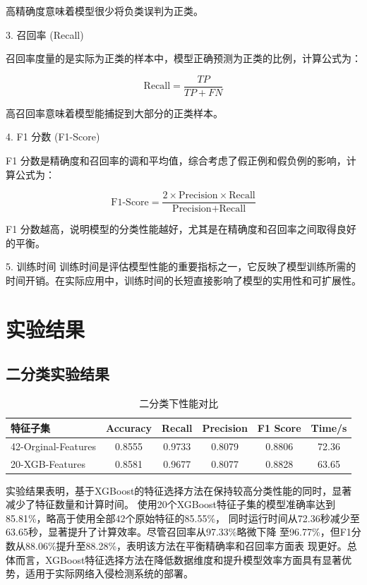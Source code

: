 \documentclass{article}
\begin{document}
   高精确度意味着模型很少将负类误判为正类。

3. 召回率 (Recall)

   召回率度量的是实际为正类的样本中，模型正确预测为正类的比例，计算公式为：

   \[
   \text{Recall} = \frac{TP}{TP + FN}
   \]

   高召回率意味着模型能捕捉到大部分的正类样本。

4. F1 分数 (F1-Score)

   F1 分数是精确度和召回率的调和平均值，综合考虑了假正例和假负例的影响，计算公式为：

   \[
   \text{F1-Score} = \frac{2 \times \text{Precision} \times \text{Recall}}{\text{Precision} + \text{Recall}}
   \]

   F1 分数越高，说明模型的分类性能越好，尤其是在精确度和召回率之间取得良好的平衡。

5. 训练时间
   训练时间是评估模型性能的重要指标之一，它反映了模型训练所需的时间开销。在实际应用中，训练时间的长短直接影响了模型的实用性和可扩展性。



\section{实验结果}
\subsection{二分类实验结果}
\begin{table}[H]
  \caption{二分类下性能对比}
  \label{table:feature_selection_performance}
  \centering
  \begin{tabular}{lccccc}
    \toprule
    特征子集          & Accuracy & Recall & Precision & F1 Score & Time/s \\ \midrule
    42-Orginal-Features & 0.8555   & 0.9733 & 0.8079    & 0.8806   & 72.36  \\
    20-XGB-Features     & 0.8581   & 0.9677 & 0.8077    & 0.8828   & 63.65  \\ \bottomrule
  \end{tabular}
\end{table}
实验结果表明，基于XGBoost的特征选择方法在保持较高分类性能的同时，显著减少了特征数量和计算时间。
使用20个XGBoost特征子集的模型准确率达到85.81\%，略高于使用全部42个原始特征的85.55\%，
同时运行时间从72.36秒减少至63.65秒，显著提升了计算效率。尽管召回率从97.33\%略微下降
至96.77\%，但F1分数从88.06\%提升至88.28\%，表明该方法在平衡精确率和召回率方面表
现更好。总体而言，XGBoost特征选择方法在降低数据维度和提升模型效率方面具有显著优势，适用于实际网络入侵检测系统的部署。
\end{document}
